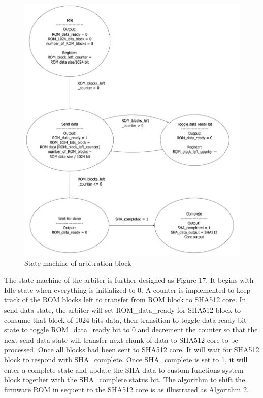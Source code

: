 \documentclass[]{rsos}%
\begin{document}
\begin{figure}[hbt!]
	\centering
	\includegraphics[width=1\textwidth]{figs/StateMachine.JPG}
	\caption{State machine of arbitration block}
\end{figure}


The state machine of the arbiter is further designed as Figure 17. It begins with Idle state when everything is initialized to 0. A counter is implemented to keep track of the ROM blocks left to transfer from ROM block to SHA512 core. In send data state, the arbiter will set ROM\_data\_ready for SHA512 block to consume that block of 1024 bits data, then transition to toggle data ready bit state to toggle ROM\_data\_ready bit to 0 and decrement the counter so that the next send data state will transfer next chunk of data to SHA512 core to be processed. Once all blocks had been sent to SHA512 core. It will wait for SHA512 block to respond with SHA\_complete. Once SHA\_complete is set to 1, it will enter a complete state and update the SHA data to custom functions system block together with the SHA\_complete status bit. The algorithm to shift the firmware ROM in sequent to the SHA512 core is as illustrated as Algorithm 2.
\end{document}
